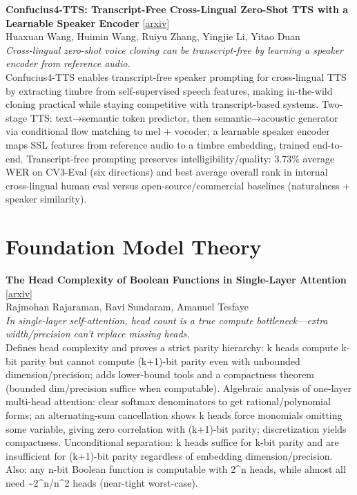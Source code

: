 \documentclass[12pt,letterpaper]{article}
\begin{document}
\medskip

{\small\textbf{Confucius4-TTS: Transcript-Free Cross-Lingual Zero-Shot TTS with a Learnable Speaker Encoder}} {\scriptsize[\href{https://arxiv.org/abs/2608.11650}{arxiv}]}\\
{\scriptsize Huaxuan Wang, Huimin Wang, Ruiyu Zhang, Yingjie Li, Yitao Duan}\\

{\small\textit{Cross-lingual zero-shot voice cloning can be transcript-free by learning a speaker encoder from reference audio.}}\\[1pt]
{\footnotesize Confucius4-TTS enables transcript-free speaker prompting for cross-lingual TTS by extracting timbre from self-supervised speech features, making in-the-wild cloning practical while staying competitive with transcript-based systems. Two-stage TTS: text→semantic token predictor, then semantic→acoustic generator via conditional flow matching to mel + vocoder; a learnable speaker encoder maps SSL features from reference audio to a timbre embedding, trained end-to-end. Transcript-free prompting preserves intelligibility/quality: 3.73\% average WER on CV3-Eval (six directions) and best average overall rank in internal cross-lingual human eval versus open-source/commercial baselines (naturalness + speaker similarity).}

\medskip


\section*{Foundation Model Theory}

{\small\textbf{The Head Complexity of Boolean Functions in Single-Layer Attention}} {\scriptsize[\href{https://arxiv.org/abs/2609.04046}{arxiv}]}\\
{\scriptsize Rajmohan Rajaraman, Ravi Sundaram, Amanuel Tesfaye}\\

{\small\textit{In single-layer self-attention, head count is a true compute bottleneck---extra width/precision can't replace missing heads.}}\\[1pt]
{\footnotesize Defines head complexity and proves a strict parity hierarchy: k heads compute k-bit parity but cannot compute (k+1)-bit parity even with unbounded dimension/precision; adds lower-bound tools and a compactness theorem (bounded dim/precision suffice when computable). Algebraic analysis of one-layer multi-head attention: clear softmax denominators to get rational/polynomial forms; an alternating-sum cancellation shows k heads force monomials omitting some variable, giving zero correlation with (k+1)-bit parity; discretization yields compactness. Unconditional separation: k heads suffice for k-bit parity and are insufficient for (k+1)-bit parity regardless of embedding dimension/precision. Also: any n-bit Boolean function is computable with 2\textasciicircum{}n heads, while almost all need \textasciitilde{}2\textasciicircum{}n/n\textasciicircum{}2 heads (near-tight worst-case).}
\end{document}
